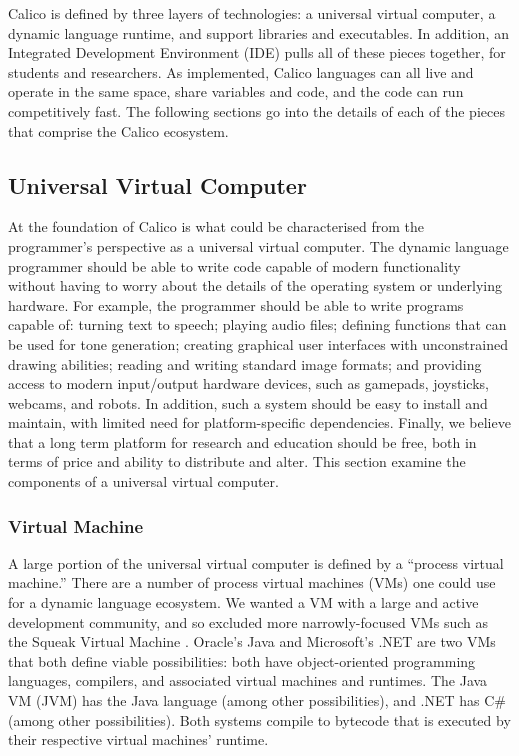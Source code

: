 \documentclass[preprint]{sigplanconf}
\begin{document}
Calico is defined by three layers of technologies: a universal virtual
computer, a dynamic language runtime, and support libraries and
executables. In addition, an Integrated Development Environment (IDE)
pulls all of these pieces together, for students and researchers. As
implemented, Calico languages can all live and operate in the same
space, share variables and code, and the code can run competitively
fast. The following sections go into the details of each of the pieces
that comprise the Calico ecosystem.

\subsection{Universal Virtual Computer}

At the foundation of Calico is what could be characterised from the
programmer's perspective as a universal virtual computer. The dynamic
language programmer should be able to write code capable of modern
functionality without having to worry about the details of the
operating system or underlying hardware. For example, the programmer
should be able to write programs capable of: turning text to speech;
playing audio files; defining functions that can be used for tone
generation; creating graphical user interfaces with unconstrained
drawing abilities; reading and writing standard image formats; and
providing access to modern input/output hardware devices, such as
gamepads, joysticks, webcams, and robots. In addition, such a system
should be easy to install and maintain, with limited need for
platform-specific dependencies. Finally, we believe that a long term
platform for research and education should be free, both in terms of
price and ability to distribute and alter. This section examine the
components of a universal virtual computer.

\subsubsection{Virtual Machine}

A large portion of the universal virtual computer is defined by a
``process virtual machine.'' There are a number of process virtual
machines (VMs) one could use for a dynamic language ecosystem. We
wanted a VM with a large and active development community, and so
excluded more narrowly-focused VMs such as the Squeak Virtual Machine
\cite{squeakvm}. Oracle's Java and
Microsoft's .NET are two VMs that both define viable possibilities:
both have object-oriented programming languages, compilers, and
associated virtual machines and runtimes. The Java VM (JVM) has the
Java language (among other possibilities), and .NET has C\# (among
other possibilities). Both systems compile to bytecode that is
executed by their respective virtual machines' runtime.
\end{document}
